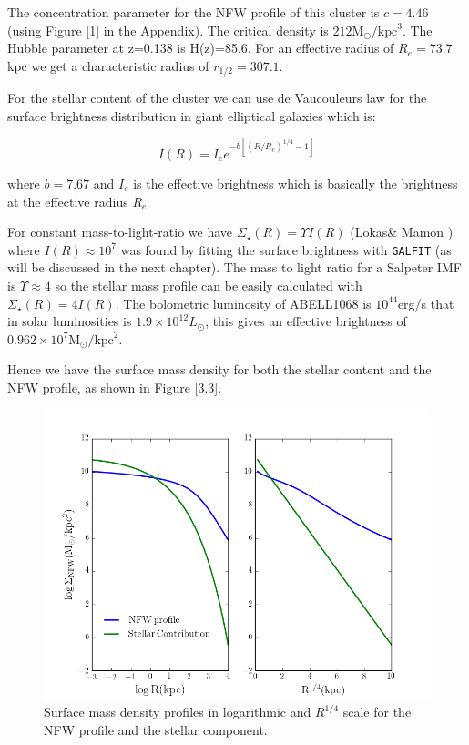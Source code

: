 The concentration parameter for the NFW profile of this cluster is $c=4.46$ (using Figure [1] in the Appendix). The critical density is $212 \text{M}_{\odot}/\text{kpc}^{3}$. The Hubble parameter at z=0.138 is H(z)=85.6. For an effective radius of $R_{e}=73.7$ kpc we get a characteristic radius of $r_{1/2}=307.1$.

For the stellar content of the cluster we can use de Vaucouleurs law for the surface brightness distribution in giant elliptical galaxies which is:

\begin{equation}
I(R)=I_{e}e^{-b\left[\left(R/R_{e}\right)^{1/4}-1\right]}
\end{equation}

where $b=7.67$ and $I_{e}$ is the effective brightness which is basically the brightness at the effective radius $R_{e}$

For constant mass-to-light-ratio we have $\Sigma_{\star}(R)= \Upsilon I(R)$ (Lokas\& Mamon \citeyear{Reference14}) where  $I(R)\approx 10^{7}$ was found by fitting the surface brightness with \texttt{GALFIT} (as will be discussed in the next chapter). The mass to light ratio for a Salpeter IMF is $\Upsilon\approx 4$ so the stellar mass profile can be easily calculated with  $\Sigma_{\star}(R)= 4I(R)$. The bolometric luminosity of ABELL1068 is $10^{44}$erg/s that in solar luminosities is $1.9\times 10^{12} L_{\odot}$, this gives an effective brightness of $0.962\times 10^{7}\text{M}_{\odot}/\text{kpc}^2$. 

Hence we have the surface mass density for both the stellar content and the NFW profile, as shown in Figure [3.3].

\begin{figure}[H]
\centering
\includegraphics[width=12cm]{images/Surface_mass_density_log.png}
\caption[Surface mass density profiles]{Surface mass density profiles in logarithmic and $R^{1/4}$ scale for the NFW profile and the stellar component.}
\end{figure}

